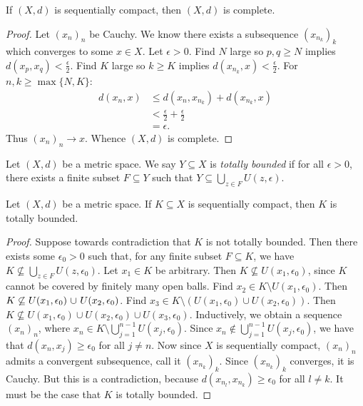     \begin{proposition}\label{prop:seq-implies-complete}
        If $(X,d)$ is sequentially compact, then $(X,d)$ is complete.
    \end{proposition}
        \begin{proof}
            Let $(x_n)_n$ be Cauchy. We know there exists a subsequence $(x_{n_k})_k$ which converges to some $x \in X$. Let $\epsilon > 0$. Find $N$ large so $p,q \geq N$ implies $d(x_p,x_q) < \frac{\epsilon}{2}$. Find $K$ large so $k \geq K$ implies $d(x_{n_k},x) < \frac{\epsilon}{2}$. For $n,k \geq \max\{N,K\}$:
                \begin{equation*}
                \begin{split}
                    d(x_n,x)
                    & \leq d(x_n,x_{n_k}) + d(x_{n_k}, x) \\
                    & < \frac{\epsilon}{2} + \frac{\epsilon}{2} \\
                    & = \epsilon.
                \end{split}
                \end{equation*}
            Thus $(x_n)_n \rightarrow x$. Whence $(X,d)$ is complete.
        \end{proof}

    \begin{definition}
        Let $(X,d)$ be a metric space. We say $Y \subseteq X$ is \textit{totally bounded} if for all $\epsilon > 0$, there exists a finite subset $F\subseteq Y$ such that $Y \subseteq \bigcup_{z \in F}U(z,\epsilon)$.
    \end{definition}

    \begin{proposition}\label{prop:sequential-implies-tot-bounded}
        Let $(X,d)$ be a metric space. If $K \subseteq X$ is sequentially compact, then $K$ is totally bounded.
    \end{proposition}
        \begin{proof}
            Suppose towards contradiction that $K$ is not totally bounded. Then there exists some $\epsilon_0 > 0$ such that, for any finite subset $F \subseteq K$, we have $K \not\subseteq \bigcup_{z \in F}U(z,\epsilon_0)$. Let $x_1 \in K$ be arbitrary. Then $K \not\subseteq U(x_1,\epsilon_0)$, since $K$ cannot be covered by finitely many open balls. Find $x_2 \in K \setminus U(x_1,\epsilon_0)$. Then $K \not\subseteq U(x_1,\epsilon_0) \h1\cup\h1 U(x_2,\epsilon_0)$. Find $x_3 \in K \setminus \left( U(x_1,\epsilon_0) \cup U(x_2,\epsilon_0) \right)$. Then $K \not\subseteq U(x_1,\epsilon_0) \cup U(x_2,\epsilon_0) \cup U(x_3,\epsilon_0)$. Inductively, we obtain a sequence $(x_n)_n$, where $x_n \in K \setminus \bigcup_{j = 1}^{n-1}U(x_j,\epsilon_0)$. Since $x_n \not\in \bigcup_{j = 1}^{n-1}U(x_j,\epsilon_0)$, we have that $d(x_n,x_j) \geq \epsilon_0$ for all $j \neq n$. Now since $X$ is sequentially compact, $(x_n)_n$ admits a convergent subsequence, call it $(x_{n_k})_k$. Since $(x_{n_k})_k$ converges, it is Cauchy. But this is a contradiction, because $d(x_{n_l},x_{n_k}) \geq \epsilon_0$ for all $l \neq k$. It must be the case that $K$ is totally bounded. 
        \end{proof}

